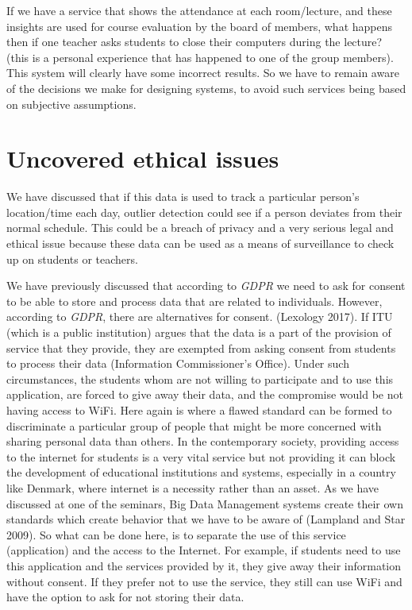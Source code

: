 \documentclass[format=acmsmall, review=false, screen=true]{acmart}
\begin{document}
If we have a service that shows the attendance at each room/lecture, and these insights are used for course evaluation by the board of members, what happens then if one teacher asks students to close their computers during the lecture? (this is a personal experience that has happened to one of the group members). This system will clearly have some incorrect results. So we have to remain aware of the decisions we make for designing systems, to avoid such services being based on subjective assumptions.

\section{Uncovered ethical issues}

We have discussed that if this data is used to track a particular person’s location/time each day, outlier detection could see if a person deviates from their normal schedule. This could be a breach of privacy and a very serious legal and ethical issue because these data can be used as a means of surveillance to check up on students or teachers. 

We have previously discussed that according to \textit{GDPR} we need to ask for consent to be able to store and process data that are related to individuals. However, according to \textit{GDPR}, there are alternatives for consent.  (Lexology 2017). If ITU (which is a public institution) argues that the data is a part of the provision of service that they provide, they are exempted from asking consent from students to process their data (Information Commissioner's Office). Under such circumstances, the students whom are not willing to participate and to use this application, are forced to give away their data, and the compromise would be not having access to WiFi. Here again is where a flawed standard can be formed to discriminate a particular group of people that might be more concerned with sharing personal data than others. In the contemporary society, providing access to the internet for students is a very vital service but not providing it can block the development of educational institutions and systems, especially in a country like Denmark, where internet is a necessity rather than an asset. As we have discussed at one of the seminars, Big Data Management systems create their own standards which create behavior that we have to be aware of (Lampland and Star 2009). So what can be done here, is to separate the use of this service (application) and the access to the Internet. For example, if students need to use this application and the services provided by it, they give away their information without consent. If they prefer not to use the service, they still can use WiFi and have the option to ask for not storing their data. 
\end{document}
